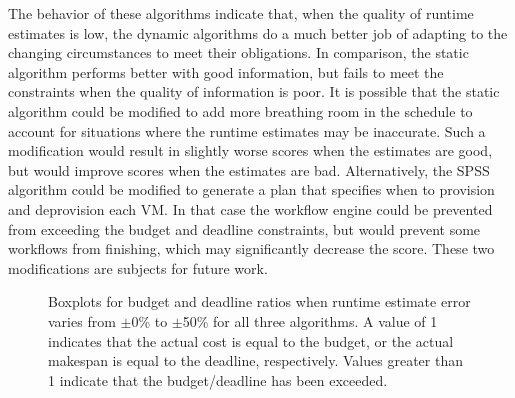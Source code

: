 \documentclass[conference]{IEEEtran}
\begin{document}
The behavior of these algorithms indicate that, when the quality of runtime estimates is low, the dynamic algorithms do a much better job of adapting to the changing circumstances to meet their obligations. In comparison, the static algorithm performs better with good information, but fails to meet the constraints when the quality of information is poor. It is possible that the static algorithm could be modified to add more breathing room in the schedule to account for situations where the runtime estimates may be inaccurate. Such a modification would result in slightly worse scores when the estimates are good, but would improve scores when the estimates are bad. Alternatively, the SPSS algorithm could be modified to generate a plan that specifies when to provision and deprovision each VM. In that case the workflow engine could be prevented from exceeding the budget and deadline constraints, but would prevent some workflows from finishing, which may significantly decrease the score. These two modifications are subjects for future work.

\begin{figure}[tb]
    \caption[Boxplots for budget and deadline ratios when runtime estimates are inaccurate]{Boxplots for budget and deadline ratios when runtime estimate error varies from $\pm$0\% to $\pm$50\% for all three algorithms. A value of 1 indicates that the actual cost is equal to the budget, or the actual makespan is equal to the deadline, respectively. Values greater than 1 indicate that the budget/deadline has been exceeded.}
    \label{fig:variances}
\end{figure}
\end{document}
